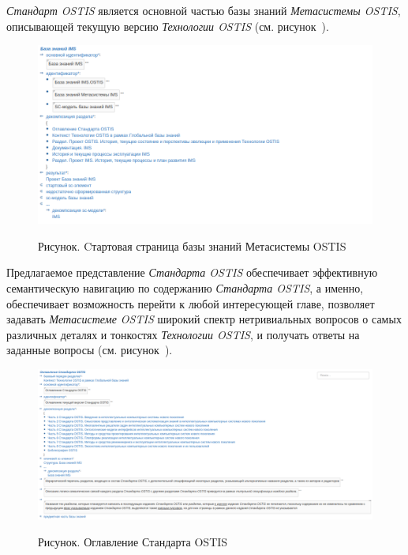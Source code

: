\textit{Стандарт OSTIS} является основной частью базы знаний \textit{Метасистемы OSTIS}, описывающей текущую версию \textit{Технологии OSTIS} (см. рисунок~\textit{}).

\begin{figure}[H]
	\caption{Рисунок. Cтартовая страница базы знаний Метасистемы OSTIS}
	\includegraphics[scale=0.8, width=1.0\textwidth]{images/part7/chapter_ims_standard/ims_main_page.png}
	\label{fig:main_page}
\end{figure}

Предлагаемое представление \textit{Стандарта OSTIS} обеспечивает эффективную семантическую навигацию по содержанию \textit{Стандарта OSTIS}, а именно, обеспечивает возможность перейти к любой интересующей главе, позволяет задавать \textit{Метасистеме OSTIS} широкий спектр нетривиальных вопросов о самых различных деталях и тонкостях \textit{Технологии OSTIS}, и получать ответы на заданные вопросы (см. рисунок~\textit{}). 

\begin{figure}[H]
	\caption{Рисунок. Оглавление Стандарта OSTIS}
	\includegraphics[scale=0.8, width=1.0\textwidth]{images/part7/chapter_ims_standard/table_of_contents.png}
	\label{fig:table_of_contents}
\end{figure}

